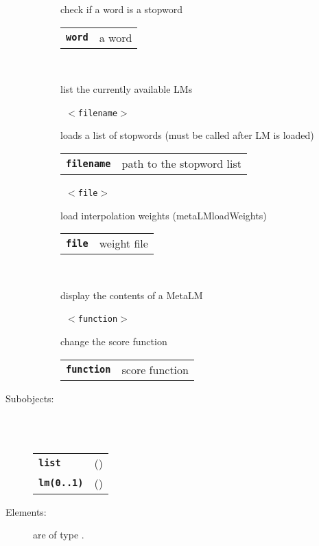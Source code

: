 \begin{description}
\begin{description}
        check if a word is a stopword

      \begin{tabular}{ll}
 \texttt{\textbf{word}} &  a word  \\
      \end{tabular}
       \texttt{} \

        list the currently available LMs

       \texttt{ $<$filename$>$} \

        loads a list of stopwords (must be called after LM is loaded)

      \begin{tabular}{ll}
 \texttt{\textbf{filename}} &  path to the stopword list  \\
      \end{tabular}
       \texttt{ $<$file$>$} \

        load interpolation weights (metaLMloadWeights)

      \begin{tabular}{ll}
 \texttt{\textbf{file}} &       weight file  \\
      \end{tabular}
       \texttt{} \

        display the contents of a MetaLM

       \texttt{ $<$function$>$} \

        change the score function

      \begin{tabular}{ll}
 \texttt{\textbf{function}} &  score function   \\
      \end{tabular}
    \end{description}

  \item[Subobjects:] \hfill \\
\ 
    \begin{tabular}{ll}
      \texttt{\textbf{list}} & (\Jref{module}{List}) \\
      \texttt{\textbf{lm(0..1)}} & (\Jref{module}{???}) \\
    \end{tabular}
\vspace{3mm}

  \item[Elements:] are of type .


\end{description}

